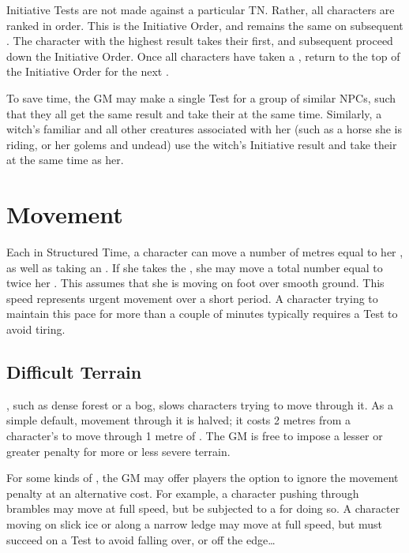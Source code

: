 Initiative Tests are not made against a particular TN.
Rather, all characters are ranked in order.
This is the Initiative Order, and remains the same on subsequent {\rounds}.
The character with the highest result takes their {\turn} first, and subsequent {\turns} proceed down the Initiative Order.
Once all characters have taken a {\turn}, return to the top of the Initiative Order for the next {\round}.

To save time, the GM may make a single Test for a group of similar NPCs, such that they all get the same result and take their {\turns} at the same time.
Similarly, a witch's familiar and all other creatures associated with her (such as a horse she is riding, or her golems and undead) use the witch's Initiative result and take their {\turns} at the same time as her.

\section{Movement}

Each {\turn} in Structured Time, a character can move a number of metres equal to her , as well as taking an {\action}.
If she takes the  {\action}, she may move a total number equal to twice her .
This assumes that she is moving on foot over smooth ground.
This speed represents urgent movement over a short period.
A character trying to maintain this pace for more than a couple of minutes typically requires a  Test to avoid tiring.



\subsection{Difficult Terrain}

{\diffterrain}, such as dense forest or a bog, slows characters trying to move through it.
As a simple default, movement through it is halved; it costs 2 metres from a character's  to move through 1 metre of {\diffterrain}.
The GM is free to impose a lesser or greater penalty for more or less severe terrain.

For some kinds of {\diffterrain}, the GM may offer players the option to ignore the movement penalty at an alternative cost.
For example, a character pushing through brambles may move at full speed, but be subjected to a {\damagetest} for doing so.
A character moving on slick ice or along a narrow ledge may move at full speed, but must succeed on a  Test to avoid falling over, or off the edge{\dots}

